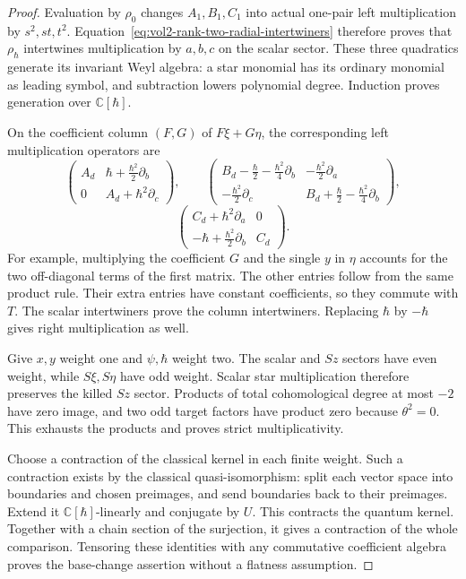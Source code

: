 \begin{proof}
Evaluation by $\rho_0$ changes $A_1,B_1,C_1$ into actual
one-pair left multiplication by $s^2,st,t^2$.
Equation~\eqref{eq:vol2-rank-two-radial-intertwiners}
therefore proves that $\rho_\hbar$ intertwines multiplication
by $a,b,c$ on the scalar sector.
These three quadratics generate its invariant Weyl algebra:
a star monomial has its ordinary monomial as leading symbol,
and subtraction lowers polynomial degree. Induction proves
generation over $\mathbb C[\hbar]$.

On the coefficient column $(F,G)$ of $F\xi+G\eta$,
the corresponding left multiplication operators are
\[
 \begin{pmatrix}
 A_d&\hbar+\frac{\hbar^2}{2}\partial_b\\
 0&A_d+\hbar^2\partial_c
 \end{pmatrix},
 \qquad
 \begin{pmatrix}
 B_d-\frac\hbar2-\frac{\hbar^2}{4}\partial_b
    &-\frac{\hbar^2}{2}\partial_a\\
 -\frac{\hbar^2}{2}\partial_c
    &B_d+\frac\hbar2-\frac{\hbar^2}{4}\partial_b
 \end{pmatrix},
\]
\[
 \begin{pmatrix}
 C_d+\hbar^2\partial_a&0\\
 -\hbar+\frac{\hbar^2}{2}\partial_b&C_d
 \end{pmatrix}.
\]
For example, multiplying the coefficient $G$ and the single
$y$ in $\eta$ accounts for the two off-diagonal terms of the
first matrix. The other entries follow from the same product
rule. Their extra entries have constant coefficients, so they
commute with $T$. The scalar intertwiners prove the column
intertwiners. Replacing $\hbar$ by $-\hbar$ gives right
multiplication as well.

Give $x,y$ weight one and $\psi,\hbar$ weight two.
The scalar and $Sz$ sectors have even weight, while
$S\xi,S\eta$ have odd weight. Scalar star multiplication
therefore preserves the killed $Sz$ sector.
Products of total cohomological degree at most $-2$ have
zero image, and two odd target factors have product zero
because $\theta^2=0$. This exhausts the products and proves
strict multiplicativity.

Choose a contraction of the classical kernel in each finite
weight. Such a contraction exists by the classical
quasi-isomorphism: split each vector space into boundaries
and chosen preimages, and send boundaries back to their
preimages. Extend it $\mathbb C[\hbar]$-linearly and conjugate
by $U$. This contracts the quantum kernel.
Together with a chain section of the surjection, it gives a
contraction of the whole comparison. Tensoring these
identities with any commutative coefficient algebra proves the base-change
assertion without a flatness assumption.
\end{proof}

